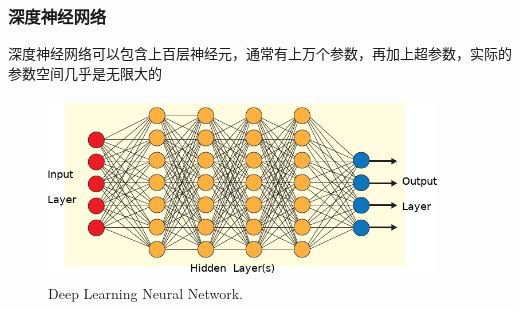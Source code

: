 \frame
{
	\frametitle{深度神经网络}
深度神经网络可以包含上百层神经元，通常有上万个参数，再加上超参数，实际的参数空间几乎是无限大的%
\begin{figure}[h!]
\centering
\includegraphics[height=1.90in,width=4.05in]{Figures/ANN_Algorithm.png}
\caption{\tiny \textrm{Deep Learning Neural Network.}}%
\label{Fig:Deep-Learning-NN}
\end{figure}
}
%
%
